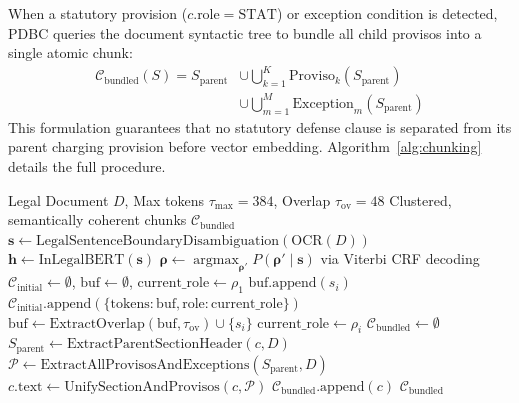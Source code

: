 \documentclass[conference]{IEEEtran}
\begin{document}
When a statutory provision ($c.\text{role} = \text{STAT}$) or exception condition is detected, PDBC queries the document syntactic tree to bundle all child provisos into a single atomic chunk:
\begin{equation}
\begin{aligned}
\mathcal{C}_{\text{bundled}}(S) = S_{\text{parent}} &\cup \bigcup_{k=1}^K \text{Proviso}_k(S_{\text{parent}}) \\
&\cup \bigcup_{m=1}^M \text{Exception}_m(S_{\text{parent}})
\end{aligned}
\end{equation}
This formulation guarantees that no statutory defense clause is separated from its parent charging provision before vector embedding. Algorithm~\ref{alg:chunking} details the full procedure.

\begin{algorithm}[!t]
\caption{Proviso-Aware Rhetorical Chunking and Bundling}
\label{alg:chunking}
\begin{algorithmic}[1]
\Require Legal Document $D$, Max tokens $\tau_{\max}=384$, Overlap $\tau_{\text{ov}}=48$
\Ensure Clustered, semantically coherent chunks $\mathcal{C}_{\text{bundled}}$
\State $\mathbf{s} \gets \text{LegalSentenceBoundaryDisambiguation}(\text{OCR}(D))$
\State $\mathbf{h} \gets \text{InLegalBERT}(\mathbf{s})$
\State $\mathbf{\rho} \gets \operatorname{argmax}_{\mathbf{\rho}'} P(\mathbf{\rho}' \mid \mathbf{s})$ via Viterbi CRF decoding
\State $\mathcal{C}_{\text{initial}} \gets \emptyset$, $\text{buf} \gets \emptyset$, $\text{current\_role} \gets \rho_1$
        \State $\text{buf}.\text{append}(s_i)$
    \Else
        \State $\mathcal{C}_{\text{initial}}.\text{append}(\{\text{tokens}: \text{buf}, \text{role}: \text{current\_role}\})$
        \State $\text{buf} \gets \text{ExtractOverlap}(\text{buf}, \tau_{\text{ov}}) \cup \{s_i\}$
        \State $\text{current\_role} \gets \rho_i$
    \EndIf
\EndFor
\State $\mathcal{C}_{\text{bundled}} \gets \emptyset$
        \State $S_{\text{parent}} \gets \text{ExtractParentSectionHeader}(c, D)$
        \State $\mathcal{P} \gets \text{ExtractAllProvisosAndExceptions}(S_{\text{parent}}, D)$
        \State $c.\text{text} \gets \text{UnifySectionAndProvisos}(c, \mathcal{P})$
    \EndIf
    \State $\mathcal{C}_{\text{bundled}}.\text{append}(c)$
\EndFor
\State \Return $\mathcal{C}_{\text{bundled}}$
\end{algorithmic}
\end{algorithm}
\end{document}
